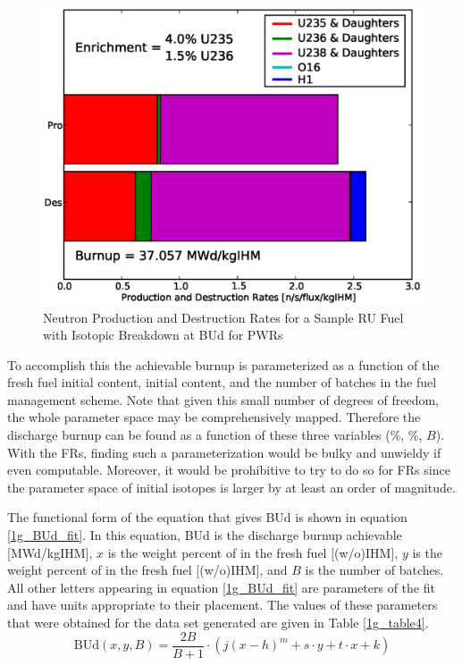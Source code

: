 \begin{figure}[htbp]
\caption{Neutron Production and Destruction Rates for a Sample RU Fuel with Isotopic Breakdown at BUd for PWRs}
\label{1g_fig13}
\begin{center}
\includegraphics[scale=0.5]{one_group_method/figs/Fig13.eps}
\end{center}
\end{figure}

To accomplish this the achievable burnup is parameterized as a function of the fresh fuel initial  
content, initial  content, and the number of batches in the fuel management scheme.    Note that 
given this small number of degrees of freedom, the whole parameter space may be comprehensively mapped.  
Therefore the discharge burnup can be found as a function of these three variables 
(\%, \%, $B$).  With the FRs, finding such a parameterization would be bulky and 
unwieldy if even computable.  Moreover, it would be prohibitive to try to do so for FRs since the parameter 
space of initial isotopes is larger by at least an order of magnitude.  

The functional form of the equation that gives BUd is shown in equation \ref{1g_BUd_fit}.  In this equation, 
BUd is the discharge burnup achievable [MWd/kgIHM], $x$ is the weight percent of  in the fresh 
fuel [(w/o)IHM], $y$ is the weight percent of  in the fresh fuel [(w/o)IHM], and $B$ is the 
number of batches.  All other letters appearing in equation \ref{1g_BUd_fit} are parameters of the fit 
and have units appropriate to their placement.  The values of these parameters that were obtained for 
the data set generated are given in Table \ref{1g_table4}.
\begin{equation}
\label{1g_BUd_fit}
\mbox{BUd}(x, y, B) = \frac{2B}{B+1}\cdot \left(j(x-h)^m + s\cdot y + t \cdot x + k\right)
\end{equation}

